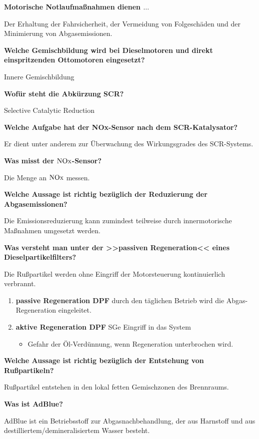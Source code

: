 \textbf{Motorische Notlaufmaßnahmen dienen $\ldots$}

Der Erhaltung der Fahrsicherheit, der Vermeidung von Folgeschäden und
der Minimierung von Abgasemissionen.

\textbf{Welche Gemischbildung wird bei Dieselmotoren und direkt
einspritzenden Ottomotoren eingesetzt?}

Innere Gemischbildung

\textbf{Wofür steht die Abkürzung SCR?}

Selective Catalytic Reduction

\textbf{Welche Aufgabe hat der NOx-Sensor nach dem SCR-Katalysator?}

Er dient unter anderem zur Überwachung des Wirkungsgrades des
SCR-Systems.

\textbf{Was misst der $\ce{NOx}$-Sensor?}

Die Menge an $\ce{NOx}$ messen.

\textbf{Welche Aussage ist richtig bezüglich der Reduzierung der
Abgasemissionen?}

Die Emissionsreduzierung kann zumindest teilweise durch innermotorische
Maßnahmen umgesetzt werden.

\textbf{Was versteht man unter der >>passiven Regeneration<< eines
Dieselpartikelfilters?}

Die Rußpartikel werden ohne Eingriff der Motorsteuerung kontinuierlich
verbrannt.

\begin{enumerate}
\item
  \textbf{passive Regeneration DPF} durch den täglichen Betrieb wird die
  Abgas-Regeneration eingeleitet.
\item
  \textbf{aktive Regeneration DPF} SGe Eingriff in das System

  \begin{itemize}
  \item
    Gefahr der Öl-Verdünnung, wenn Regeneration unterbrochen wird.
  \end{itemize}
\end{enumerate}

\textbf{Welche Aussage ist richtig bezüglich der Entstehung von
Rußpartikeln?}

Rußpartikel entstehen in den lokal fetten Gemischzonen des Brennraums.

\textbf{Was ist AdBlue?}

AdBlue ist ein Betriebsstoff zur Abgasnachbehandlung, der aus Harnstoff
und aus destilliertem/demineralisiertem Wasser besteht.

